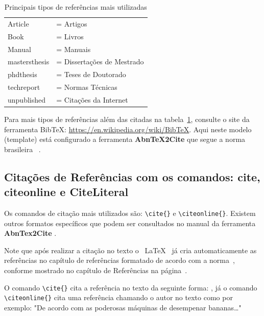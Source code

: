 \begin{table}[htb]
    \centering
    \caption{Principais tipos de referências mais utilizadas}
    \begin{tabular}{ll}
        \toprule
        Article         & = Artigos \\
        Book            & = Livros \\
        Manual          & = Manuais \\
        mastersthesis   & = Dissertações de Mestrado \\
        phdthesis       & = Teses de Doutorado \\
        techreport      & = Normas Técnicas \\
        unpublished     & = Citações da Internet\\
        \bottomrule
    \end{tabular}        
    \label{tab:Tipos_Ref}
\end{table}
    
 Para  mais tipos de referências além das citadas na tabela~\ref{tab:Tipos_Ref}, consulte o site da ferramenta BibTeX: \url{https://en.wikipedia.org/wiki/BibTeX}. 
Aqui neste modelo (template) está configurado a ferramenta {\bf AbnTeX2Cite} \cite{AbnTeX2Cite} que segue a norma brasileira ~.


\subsection{Citações de Referências com os comandos: cite,  citeonline e CiteLiteral}

Os comandos de citação mais utilizados são: \verb|\cite{}| e  \verb|\citeonline{}|. Existem outros formatos específicos que podem ser consultados no manual da ferramenta {\bf AbnTex2Cite} \cite{AbnTeX2Cite}.

Note que após realizar a citação no texto o ~\LaTeX~ já cria automaticamente as referências no capítulo de referências formatado de acordo com a norma~, conforme mostrado no capítulo de Referências na página~\pageref{cap:RefBib}.


O comando \verb|\cite{}| cita a referência no texto da seguinte forma: \cite{ApelidoArtigo}, já o comando \verb|\citeonline{}| cita uma referência chamando o autor no texto como por exemplo: "De acordo com  as poderosas máquinas de desempenar bananas\ldots"

